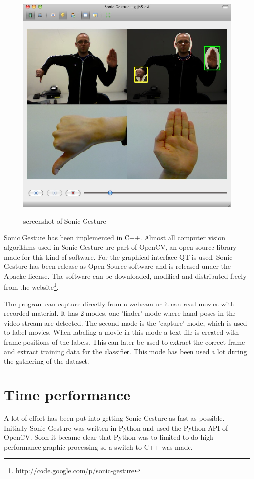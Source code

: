 \begin{figure}[ht]
\begin{center}
\label{fig:sonicgesture}
\includegraphics[width=0.6\linewidth]{figures/sonicgesture.jpg}
\end{center}
\caption{screenshot of Sonic Gesture}
\end{figure}

Sonic Gesture has been implemented in C++. Almost all computer vision algorithms used in Sonic Gesture are part of OpenCV, an open source library made for this kind of software. For the graphical interface QT is used. Sonic Gesture has been release as Open Source software and is released under the Apache license. The software can be downloaded, modified and distributed freely from the website\footnote{http://code.google.com/p/sonic-gesture}.

The program can capture directly from a webcam or it can read movies with recorded material. It has 2 modes, one 'finder' mode where hand poses in the video stream are detected. The second mode is the 'capture' mode, which is used to label movies. When labeling a movie in this mode a text file is created with frame positions of the labels. This can later be used to extract the correct frame and extract training data for the classifier. This mode has been used a lot during the gathering of the dataset.

\section{Time performance}
A lot of effort has been put into getting Sonic Gesture as fast as possible. Initially Sonic Gesture was written in Python and used the Python API of OpenCV. Soon it became clear that Python was to limited to do high performance graphic processing so a switch to C++ was made. 

